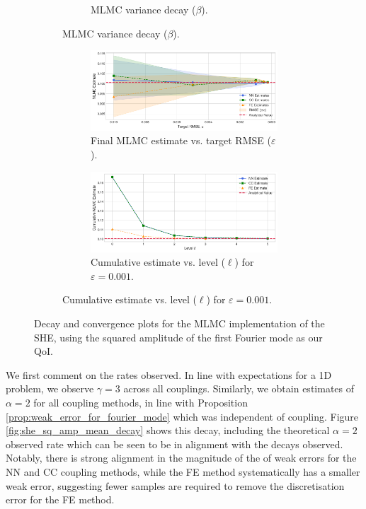\begin{figure}[htbp]
\begin{subfigure}{\textwidth}
\begin{subfigure}[b]{0.48\textwidth}
            \caption{MLMC variance decay ($\beta$).}
            \label{fig:she_sq_amp_variance_decay}
        \end{subfigure}        
    \end{subfigure}
    \vspace{1cm}
    \begin{subfigure}{\textwidth}
        \centering
        \begin{subfigure}[b]{\textwidth}
            \centering
            \includegraphics[width=0.7\linewidth]{graphics/she_sq_amp_conv.png}
            \caption{Final MLMC estimate vs. target RMSE ($\varepsilon$).}
            \label{fig:she_sq_amp_conv_vs_eps}
        \end{subfigure}
        \vspace{0.5cm}
        \begin{subfigure}[b]{\textwidth}
            \centering
            \includegraphics[width=0.7\linewidth]{graphics/she_sq_amp_cumconv.png}
            \caption{Cumulative estimate vs. level ($\ell$) for $\varepsilon=0.001$.}
            \label{fig:she_sq_amp_cumulative_conv}
        \end{subfigure}
    \end{subfigure}
    \caption{Decay and convergence plots for the MLMC implementation of the SHE, using the squared 
    amplitude of the first Fourier mode as our QoI.}
    \label{fig:she_validation_combined}
\end{figure}


We first comment on the rates observed. In line with expectations for a 1D problem, 
we observe $\gamma = 3$ across 
all couplings. Similarly, we obtain estimates of $\alpha = 2$ for all coupling methods,
in line with Proposition \ref{prop:weak_error_for_fourier_mode} which was independent 
of coupling. Figure \ref{fig:she_sq_amp_mean_decay} shows this decay, 
including the theoretical $\alpha=2$ observed rate which can be seen to be in alignment 
with the decays observed. Notably, there is strong alignment in the magnitude of the 
of weak errors for the NN and CC coupling methods, while the FE method systematically has a 
smaller weak error, suggesting fewer samples are required to remove the discretisation 
error for the FE method.

